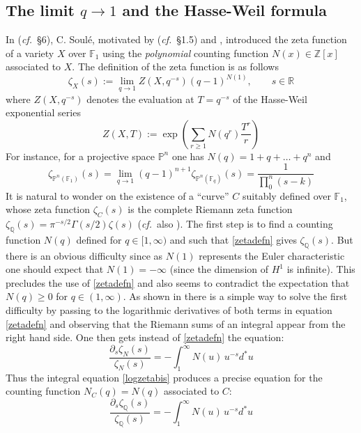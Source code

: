 \documentclass[12pt]{article}
\def\F{{\mathbb F}}
\def\P{{\mathbb P}}
\def\Q{{\mathbb Q}}
\def\R{{\mathbb R}}
\def\Z{{\mathbb Z}}
\newcommand{\cf}{{\it cf.}}
\begin{document}
\subsection{The limit $q\to 1$ and the Hasse-Weil formula} \label{counting}

In \cite{Soule} (\cf~\S 6), C. Soul\'e, motivated by \cite{Man-zetas} (\cf~\S 1.5) and  \cite{Steinberg, Tits, Ku, Den1,Den2, Kapranov}, introduced the zeta function of a variety $X$ over $\F_1$ using the {\em polynomial} counting function $N(x)\in\Z[x]$ associated to $X$. The definition of the zeta function is as follows
\begin{equation}\label{zetadefn}
\zeta_X(s):=\lim_{q\to 1}Z(X,q^{-s}) (q-1)^{N(1)},\qquad s\in\R
\end{equation}
where $Z(X,q^{-s})$ denotes the evaluation at $T=q^{-s}$  of the Hasse-Weil exponential series
\begin{equation}\label{zetadefn1}
Z(X,T) := \exp\left(\sum_{r\ge 1}N(q^r)\frac{T^r}{r}\right)
\end{equation}
For instance, for a projective space $\P^n$ one has $N(q)=1+q+\ldots +q^n$ and 
$$
 \zeta_{\P^n(\F_1)}(s) =\lim_{q\to 1} (q-1)^{n+1} \zeta_{\P^n(\F_q)}(s) = \frac{1}{\prod_0^n(s-k)}
$$
It is natural to wonder on the existence of a ``curve'' $C$ suitably defined over $\F_1$, whose zeta function $\zeta_C(s)$ is the complete Riemann zeta function  $\zeta_\Q(s)=\pi^{-s/2}\Gamma(s/2)\zeta(s)$ (\cf~also \cite{Man-zetas}). The first step is to find a counting function $N(q)$ defined for $q\in [1,\infty)$ and such that  \eqref{zetadefn} gives $\zeta_\Q(s)$. But there is an obvious difficulty since as $N(1)$ represents the Euler characteristic one should expect that   $N(1)=-\infty$ (since the dimension of $H^1$ is infinite). This precludes the use of \eqref{zetadefn}  and also seems to contradict the expectation that $N(q)\geq 0$ for $q\in (1,\infty)$. As shown in \cite{CC0,CC1} there is a simple way to solve the first difficulty by passing to the logarithmic derivatives of both terms in equation \eqref{zetadefn} and observing that the Riemann sums of an integral appear from the right hand side. One then gets instead of  \eqref{zetadefn} the equation:
\begin{equation}\label{logzetabis}
    \frac{\partial_s\zeta_N(s)}{\zeta_N(s)}=-\int_1^\infty  N(u)\, u^{-s}d^*u
\end{equation} 
Thus the integral equation \eqref{logzetabis} produces a precise equation for the counting function $N_C(q)=N(q)$ associated to $C$:
\begin{equation}\label{special}
   \frac{\partial_s\zeta_\Q(s)}{\zeta_\Q(s)}=-\int_1^\infty  N(u)\, u^{-s}d^*u
\end{equation}
\end{document}
